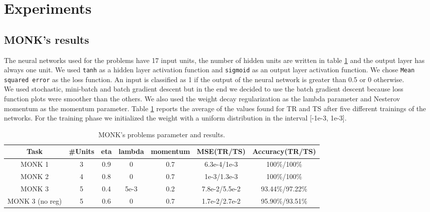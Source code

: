 \section{Experiments}


\subsection{MONK's results}

The neural networks used for the problems have 17 input units, the number of hidden units are written in table \ref{tab:dati}  and the output layer has always one unit. We used \texttt{tanh} as a hidden layer activation function and \texttt{sigmoid} as an output layer activation function. We chose \texttt{Mean squared error} as the loss function. An input is classified as 1 if the output of the neural network is greater than 0.5 or 0 otherwise.\\
We used stochastic, mini-batch and batch gradient descent but in the end we decided to use the batch gradient descent because loss function plots were smoother than the others.
We also used the weight decay regularization as the lambda parameter and Nesterov momentum as the momentum parameter. Table \ref{tab:dati} reports the average of the values found for TR and TS after five different trainings of the networks. For the training phase we initialized the weight with a uniform distribution in the interval [-1e-3, 1e-3].    
\begin{center}
\small\addtolength{\tabcolsep}{-5pt}
\begin{table}[H]
\begin{tabular}{|c|c|c|c|c|c|c|}
\hline
\textbf{Task} &	\textbf{\#Units} &\textbf{ eta} & \textbf{lambda} &\textbf{momentum} & {\textbf{MSE(TR/TS)}} &\textbf{Accuracy(TR/TS)} \\ \hline
MONK 1        &    3 & 0.9 & 0 & 0.7  &   6.3e-4/1e-3 &   100\%/100\%  \\ \hline
MONK 2        &    4 & 0.8 & 0 & 0.7  &   1e-3/1.3e-3 &   100\%/100\% \\ \hline               
MONK 3        &    5 & 0.4 &5e-3 &0.2&     7.8e-2/5.5e-2&    93.44\%/97.22\%  \\ \hline
MONK 3 (no reg)&   5 & 0.6 &   0 &  0.7 &   1.7e-2/2.7e-2 & 95.90\%/93.51\%		\\ \hline              
\end{tabular}
\caption{MONK's problems parameter and results.}
\label{tab:dati}
\end{table}
\end{center}
